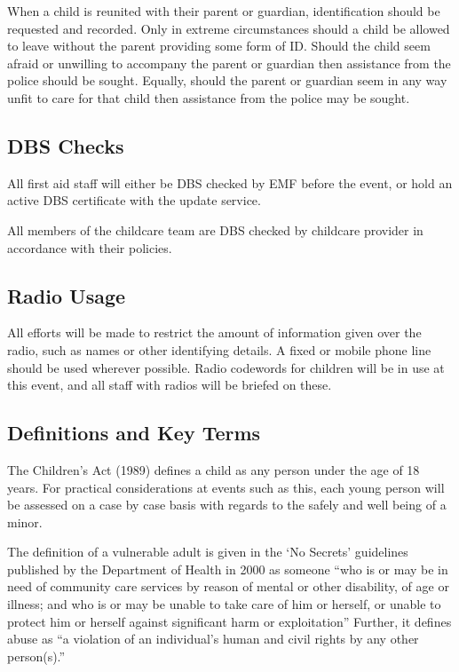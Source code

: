 When a child is reunited with their parent or guardian, identification should be
requested and recorded. Only in extreme circumstances should a child be
allowed to leave without the parent providing some form of ID. Should the child
seem afraid or unwilling to accompany the parent or guardian then assistance
from the police should be sought. Equally, should the parent or guardian
seem in any way unfit to care for that child then assistance from the
police may be sought.

\subsection{DBS Checks}
\label{dbscheck}
All first aid staff will either be DBS checked by EMF before the event, or hold an
active DBS certificate with the update service.

All members of the childcare team are DBS checked by childcare provider in accordance
with their policies.

\subsection{Radio Usage}
All efforts will be made to restrict the amount of information given over the
radio, such as names or other identifying details. A fixed or mobile phone line
should be used wherever possible. Radio codewords for children will be in
use at this event, and all staff with radios will be briefed on these.

\subsection{Definitions and Key Terms}

The Children's Act (1989) defines a child as any person under the age of 18
years. For practical considerations at events such as this, each young person
will be assessed on a case by case basis with regards to the safely and well
being of a minor.

The definition of a vulnerable adult is given in the `No Secrets' guidelines
published by the Department of Health in 2000 as someone ``who is or may be in
need of community care services by reason of mental or other disability, of age
or illness; and who is or may be unable to take care of him or herself, or
unable to protect him or herself against significant harm or exploitation''
Further, it defines abuse as ``a violation of an individual's human and civil
rights by any other person(s).''

